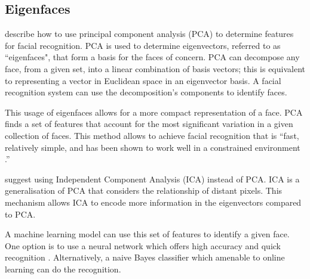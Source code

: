 \subsection{Eigenfaces}
  \citet{eigenFacesRecog} describe how to use principal component analysis (PCA) to determine features for facial recognition.
  PCA is used to determine eigenvectors, referred to as ``eigenfaces", that form a basis for the faces of concern.
  PCA can decompose any face, from a given set, into a linear combination of basis vectors; this is equivalent to representing a vector in Euclidean space in an eigenvector basis.
  A facial recognition system can use the decomposition's components to identify faces.
  
  This usage of eigenfaces allows for a more compact representation of a face.
  PCA finds a set of features that account for the most significant variation in a given collection of faces.
  This method allows \citet{eigenFacesRecog} to achieve facial recognition that is ``fast, relatively simple, and has been shown to work well in a constrained environment \cite{eigenFacesRecog}.'' 

  \citet{ICAFaceRecog} suggest using Independent Component Analysis (ICA) instead of PCA.
  ICA is a generalisation of PCA that considers the relationship of distant pixels.
  This mechanism allows ICA to encode more information in the eigenvectors compared to PCA.

  A machine learning model can use this set of features to identify a given face.
  One option is to use a neural network which offers high accuracy and quick recognition \cite{eigenFacesRecog, ICAFaceRecog}.
  Alternatively, a naive Bayes classifier which amenable to online learning \cite{murphy2012} can do the recognition.
